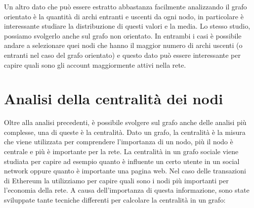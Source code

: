\documentclass[12pt]{report}
\begin{document}
Un altro dato che può essere estratto abbastanza facilmente analizzando il grafo orientato è la quantità di archi entranti e uscenti da ogni nodo, in particolare è interessante studiare la distribuzione di questi valori e la media.
Lo stesso studio, possiamo svolgerlo anche sul grafo non orientato.
In entrambi i casi è possibile andare a selezionare quei nodi che hanno il maggior numero di archi uscenti (o entranti nel caso del grafo orientato) e questo dato può essere interessante per capire quali sono gli account maggiormente attivi nella rete.

\section{Analisi della centralità dei nodi}

Oltre alla analisi precedenti, è possibile svolgere sul grafo anche delle analisi più complesse, una di queste è la centralità.
Dato un grafo, la centralità è la misura che viene utilizzata per comprendere l'importanza di un nodo, più il nodo è centrale e più è importante per la rete.
La centralità in un grafo sociale viene studiata per capire ad esempio quanto è influente un certo utente in un social network oppure quanto è importante una pagina web. 
Nel caso delle transazioni di Ethereum la utilizziamo per capire quali sono i nodi più importanti per l'economia della rete. 
A causa dell'importanza di questa informazione, sono state sviluppate tante tecniche differenti per calcolare la centralità in un grafo:
\end{document}
